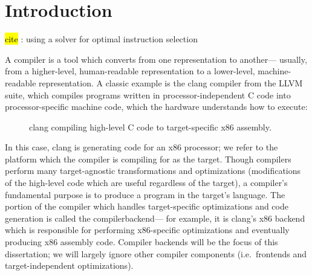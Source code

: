 \chapter{Introduction}

\hl{cite} \cite{ebner2008generalized}: using a solver for optimal instruction selection

A \gls{compiler}
  is a tool which
  converts from one representation
  to another---%
  usually, from a
  higher-level,
  human-readable representation
  to a lower-level,
  machine-readable representation.
A classic example
  is the clang compiler
  from the LLVM suite,
  which
  compiles programs written in 
  processor-independent C code
  into processor-specific
  machine code,
  which the hardware understands how
  to execute:
\begin{figure}[!h]
\centering
{}
\caption{clang compiling high-level C code to target-specific x86 assembly.}
\label{fig:clang-c-to-x86}
\end{figure}

\noindent
In this case,
  clang is generating code 
  for an x86 processor;
  we refer to 
  the platform
  which the compiler is compiling for
  as the \gls{target}.
Though compilers perform many target-agnostic
  transformations and optimizations
  (modifications of the high-level code
    which are useful regardless of the target),
  a compiler's fundamental purpose
  is to produce a program
  in the target's language.
The portion of the compiler
  which handles target-specific optimizations
  and code generation is called the
  \gls{compilerbackend}---%
  for example,
  it is clang's x86 backend which is responsible for
  performing x86-specific optimizations
  and eventually producing
  x86 assembly code.
Compiler backends will be the focus
  of this dissertation;
  we will largely ignore other compiler components
  (i.e.~frontends and target-independent optimizations).


